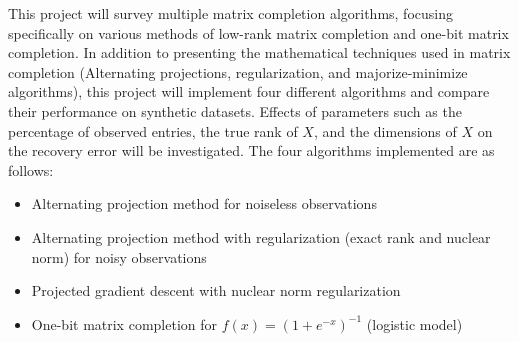 This project will survey multiple matrix completion algorithms, focusing specifically on various methods of low-rank matrix completion and one-bit matrix completion. In addition to presenting the mathematical techniques used in matrix completion (Alternating projections, regularization, and majorize-minimize algorithms), this project will implement four different algorithms and compare their performance on synthetic datasets. Effects of parameters such as the percentage of observed entries, the true rank of $X$, and the dimensions of $X$ on the recovery error will be investigated. The four algorithms implemented are as follows:
\begin{itemize}
    \item Alternating projection method for noiseless observations 
    \item Alternating projection method with regularization (exact rank and nuclear norm) for noisy observations 
    \item Projected gradient descent with nuclear norm regularization 
    \item One-bit matrix completion for $f(x) = (1 + e^{-x})^{-1}$ (logistic model)
\end{itemize}